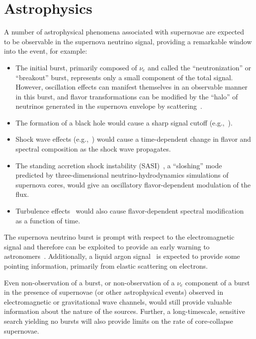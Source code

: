 
\section{Astrophysics}
\label{sec:physics-snblowe-astrophysics}



A number of astrophysical phenomena associated with supernovae are expected to be observable
in the supernova neutrino signal, providing a remarkable window into the event, for example: 
\begin{itemize}
\item The initial burst, primarily composed of $\nu_e$ and called the
  ``neutronization'' or ``breakout''
  burst, %
  represents only a small component of the total signal.  However,
  oscillation effects can manifest themselves in an observable manner
  in this burst, and flavor transformations can be modified by the
  ``halo'' of neutrinos generated in the supernova envelope by
  scattering~\cite{Cherry:2013mv}.
\item The formation of a black hole would cause a sharp signal cutoff
  (e.g.,~\cite{Beacom:2000qy,Fischer:2008rh}).
\item Shock wave effects (e.g.,~\cite{Schirato:2002tg}) would cause a
  time-dependent change in flavor and spectral composition as the
  shock wave propagates.
\item The standing accretion shock instability
  (SASI)~\cite{Hanke:2011jf,Hanke:2013ena}, a ``sloshing'' mode
  predicted by three-dimensional neutrino-hydrodynamics simulations of
  supernova cores, would give an oscillatory flavor-dependent
  modulation of the flux.
\item Turbulence effects~\cite{Friedland:2006ta,Lund:2013uta} would
  also cause flavor-dependent spectral modification as a function of
  time.
\end{itemize}

The supernova neutrino burst is prompt with respect to the
electromagnetic signal and therefore can be exploited to provide an
early warning to astronomers~\cite{Antonioli:2004zb,Scholberg:2008fa}.
Additionally, a liquid argon signal~\cite{Bueno:2003ei} is expected to
provide some pointing information, primarily from elastic scattering
on electrons.

Even non-observation of a burst, or non-observation of
a $\nu_e$ component of a burst in the presence of supernovae (or other
astrophysical events) observed in electromagnetic or gravitational
wave channels, would still provide valuable information about the
nature of the sources.  Further, a long-timescale, sensitive search
yielding no bursts will also provide limits on the rate of
core-collapse supernovae.


